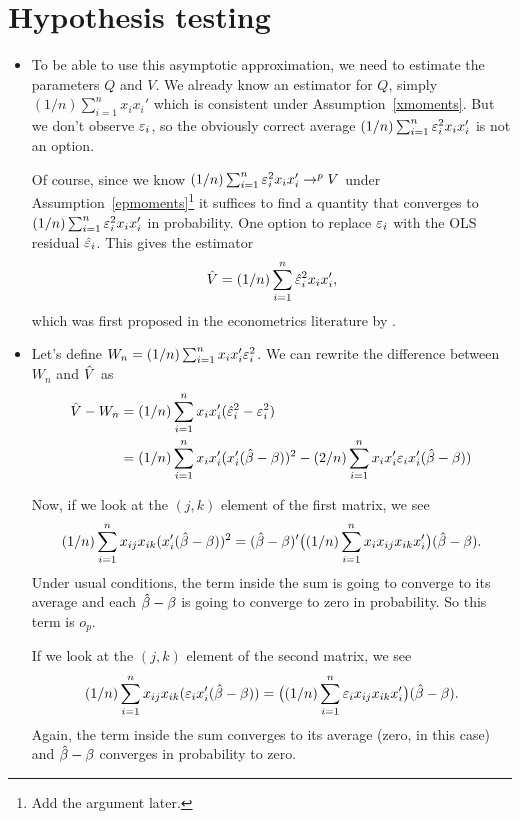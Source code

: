 \section{Hypothesis testing}

\begin{itemize}

\item To be able to use this asymptotic approximation, we need to
  estimate the parameters $Q$ and $V$.  We already know an estimator
  for $Q$, simply $(1/n) \sum_{i=1}^n x_i x_i'$ which is consistent under
  Assumption~\ref{xmoments}.  But we don't observe $\varepsilon_i$, so the
  obviously correct average $(1/n) \sum_{i=1}^n \varepsilon_i^2 x_i x_i'$ is not
  an option.

  Of course, since we know $(1/n) \sum_{i=1}^n \varepsilon_i^2 x_i x_i' \to^p V$
  under Assumption~\ref{epmoments}\footnote{Add the argument later.}
  it suffices to find a quantity that converges to $(1/n) \sum_{i=1}^n
  \varepsilon_i^2 x_i x_i'$ in probability.  One option to replace $\varepsilon_i$ with
  the OLS residual $\hat{\varepsilon}_i$.  This gives the estimator
  \begin{equation*}
    \hat{V} = (1/n) \sum_{i=1}^n \hat{\varepsilon}_i^2 x_i x_i',
  \end{equation*}
  which was first proposed in the econometrics literature by
  \citet{Whi80}.

\item Let's define $W_n = (1/n) \sum_{i=1}^n x_i x_i' \varepsilon_i^2$.  We can
  rewrite the difference between $W_n$ and $\hat{V}$ as
  \begin{align*}
    \hat{V} - W_n
    &= (1/n) \sum_{i=1}^n x_i x_i' (\hat{\varepsilon}^2_i - \varepsilon_i^2) \\
    &= (1/n) \sum_{i=1}^n x_i x_i' (x_i'(\hat{\beta} - \beta))^2
    - (2/n) \sum_{i=1}^n  x_i x_i' \varepsilon_i x_i'(\hat{\beta} - \beta))
  \end{align*}

  Now, if we look at the $(j,k)$ element of the first matrix, we see
  \begin{equation*}
    (1/n) \sum_{i=1}^n x_{ij} x_{ik}(x_i'(\hat{\beta} - \beta))^2 =
    (\hat{\beta} - \beta)' \big((1/n) \sum_{i=1}^n x_i x_{ij} x_{ik} x_{i}'\big) (\hat{\beta}- \beta).
  \end{equation*}
  Under usual conditions, the term inside the sum is going to converge
  to its average and each $\hat{\beta} - \beta$ is going to converge to zero in
  probability.  So this term is $o_p$.

  If we look at the $(j,k)$ element of the second matrix, we see
  \begin{equation*}
    (1/n) \sum_{i=1}^n x_{ij} x_{ik}(\varepsilon_i x_i'(\hat{\beta} - \beta)) =
    \big((1/n) \sum_{i=1}^n \varepsilon_i x_{ij} x_{ik} x_{i}'\big) (\hat{\beta}- \beta).
  \end{equation*}
  Again, the term inside the sum converges to its average (zero, in
  this case) and $\hat{\beta} - \beta$ converges in probability to zero.


\end{itemize}

